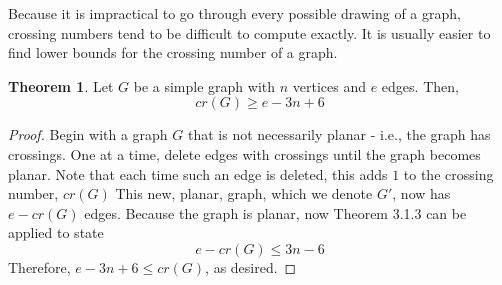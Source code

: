 \documentclass{scrippsthesisclass}
\theoremstyle{definition}
\newtheorem{theorem}{Theorem}[section]
\begin{document}
Because it is impractical to go through every possible drawing of a graph, crossing numbers tend to be difficult to compute exactly.
It is usually easier to find lower bounds for the crossing number of a graph. 

\begin{theorem}
    Let $G$ be a simple graph with $n$ vertices and $e$ edges. 
    Then,
    \[
    cr(G) \geq e - 3n + 6
    \]
\end{theorem}
\begin{proof}
    Begin with a graph $G$ that is not necessarily planar - i.e., the graph has crossings. 
    One at a time, delete edges with crossings until the graph becomes planar. 
    Note that each time such an edge is deleted, this adds $1$ to the crossing number, $cr(G)$
    This new, planar, graph, which we denote $G'$, now has $e - cr(G)$ edges. 
    Because the graph is planar, now Theorem 3.1.3 can be applied to state
    \[
    e - cr(G) \leq 3n - 6
    \]
    Therefore, $e - 3n + 6 \leq cr(G)$, as desired.
\end{proof}
\end{document}
